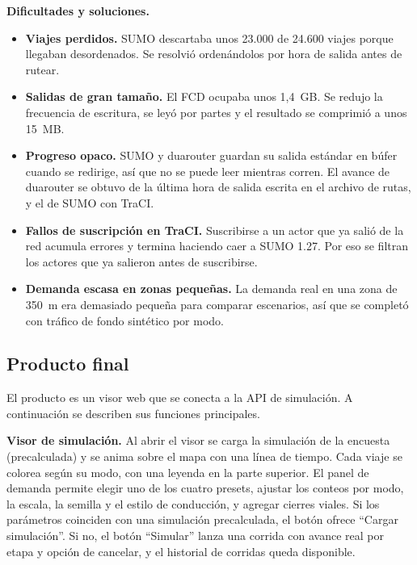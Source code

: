 \textbf{Dificultades y soluciones.}
\begin{itemize}[noitemsep]
    \item \textbf{Viajes perdidos.} SUMO descartaba unos 23.000 de 24.600 viajes porque llegaban desordenados. Se resolvió ordenándolos por hora de salida antes de rutear.
    \item \textbf{Salidas de gran tamaño.} El FCD ocupaba unos 1,4~GB. Se redujo la frecuencia de escritura, se leyó por partes y el resultado se comprimió a unos 15~MB.
    \item \textbf{Progreso opaco.} SUMO y duarouter guardan su salida estándar en búfer cuando se redirige, así que no se puede leer mientras corren. El avance de duarouter se obtuvo de la última hora de salida escrita en el archivo de rutas, y el de SUMO con TraCI.
    \item \textbf{Fallos de suscripción en TraCI.} Suscribirse a un actor que ya salió de la red acumula errores y termina haciendo caer a SUMO 1.27. Por eso se filtran los actores que ya salieron antes de suscribirse.
    \item \textbf{Demanda escasa en zonas pequeñas.} La demanda real en una zona de 350~m era demasiado pequeña para comparar escenarios, así que se completó con tráfico de fondo sintético por modo.
\end{itemize}

\subsection{Producto final}

El producto es un visor web que se conecta a la API de simulación. A continuación se describen sus funciones principales.

\textbf{Visor de simulación.} Al abrir el visor se carga la simulación de la encuesta (precalculada) y se anima sobre el mapa con una línea de tiempo. Cada viaje se colorea según su modo, con una leyenda en la parte superior. El panel de demanda permite elegir uno de los cuatro presets, ajustar los conteos por modo, la escala, la semilla y el estilo de conducción, y agregar cierres viales. Si los parámetros coinciden con una simulación precalculada, el botón ofrece “Cargar simulación”. Si no, el botón “Simular” lanza una corrida con avance real por etapa y opción de cancelar, y el historial de corridas queda disponible.


